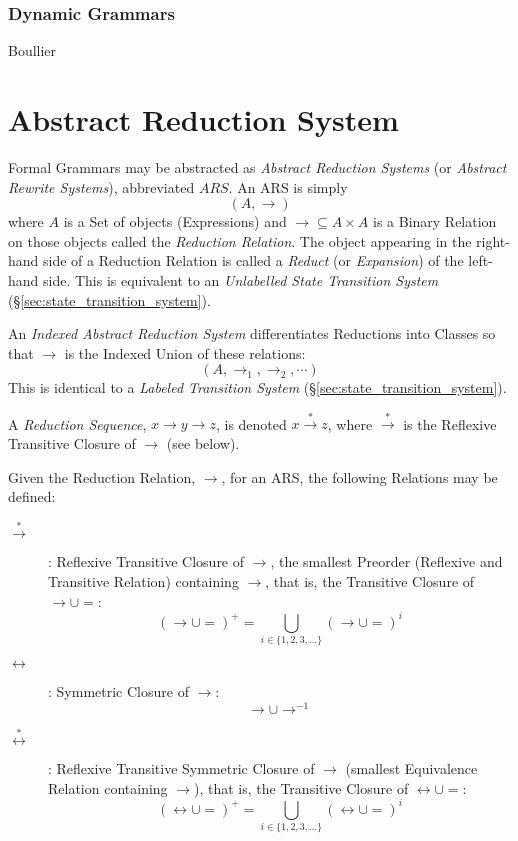 \subsubsection{Dynamic Grammars}

Boullier\cite{boullier94}



\section{Abstract Reduction System}\label{sec:abstract_rewrite}

Formal Grammars may be abstracted as \emph{Abstract Reduction Systems}
(or \emph{Abstract Rewrite Systems}), abbreviated $ARS$. An ARS is
simply
    \[(A,\rightarrow)\]
where $A$ is a Set of objects (Expressions) and $\rightarrow \subseteq
A \times A$ is a Binary Relation on those objects called the
\emph{Reduction Relation}. The object appearing in the right-hand side
of a Reduction Relation is called a \emph{Reduct} (or
\emph{Expansion}) of the left-hand side. This is equivalent to an
\emph{Unlabelled State Transition System}
(\S\ref{sec:state_transition_system}).

An \emph{Indexed Abstract Reduction System} differentiates Reductions
into Classes so that $\rightarrow$ is the Indexed Union of these
relations:
    \[(A, \rightarrow_1, \rightarrow_2, \cdots)\]
This is identical to a \emph{Labeled Transition System}
(\S\ref{sec:state_transition_system}).

A \emph{Reduction Sequence}, $x \rightarrow y \rightarrow z$, is
denoted $x \stackrel{*}\rightarrow z$, where $\stackrel{*}\rightarrow$
is the Reflexive Transitive Closure of $\rightarrow$ (see below).

Given the Reduction Relation, $\rightarrow$, for an ARS, the following
Relations may be defined:

\begin{description}

\item [$\stackrel{*}\rightarrow$]: Reflexive Transitive Closure of
  $\rightarrow$, the smallest Preorder (Reflexive and Transitive
  Relation) containing $\rightarrow$, that is, the Transitive Closure
  of $\rightarrow \cup =$:
  \[ (\rightarrow \cup =)^+ =
    \bigcup_{i \in \{1,2,3,...\}} (\rightarrow \cup =)^i \]

\item [$\leftrightarrow$]: Symmetric Closure of $\rightarrow$:
  \[ \rightarrow \cup \rightarrow^{-1} \]

\item [$\stackrel{*}\leftrightarrow$]: Reflexive Transitive
  Symmetric Closure of $\rightarrow$ (smallest Equivalence Relation
  containing $\rightarrow$), that is, the Transitive Closure of
  $\leftrightarrow \cup =$:
  \[ (\leftrightarrow \cup =)^+ =
    \bigcup_{i \in \{1,2,3,...\}} (\leftrightarrow \cup =)^i \]

\end{description}



